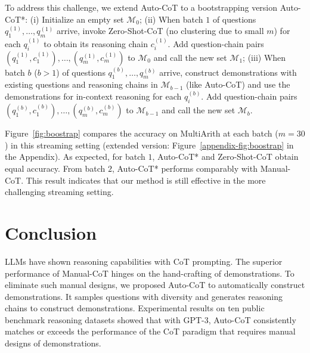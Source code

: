 To address this challenge, we extend Auto-CoT to a bootstrapping  version Auto-CoT*:
(i) Initialize an empty set $\mathcal{M}_0$;
(ii) When batch $1$ of questions $q_1^{(1)}, \ldots, q_m^{(1)}$ arrive, invoke Zero-Shot-CoT (no clustering due to small $m$) for each $q_i^{(1)}$ to obtain its reasoning chain $c_i^{(1)}$.
Add question-chain pairs $(q_1^{(1)}, c_1^{(1)}), \ldots, (q_m^{(1)}, c_m^{(1)})$ to $\mathcal{M}_0$ and call the new set $\mathcal{M}_1$;
(iii) When batch $b$ ($b>1$) of questions $q_1^{(b)}, \ldots, q_m^{(b)}$ arrive, construct demonstrations with existing questions and reasoning chains in $\mathcal{M}_{b-1}$ (like Auto-CoT) and use the demonstrations for in-context reasoning for each $q_i^{(b)}$.
Add question-chain pairs $(q_1^{(b)}, c_1^{(b)}), \ldots, (q_m^{(b)}, c_m^{(b)})$ to $\mathcal{M}_{b-1}$ and call the new set $\mathcal{M}_b$.

Figure~\ref{fig:boostrap} 
compares the accuracy on MultiArith at each batch ($m=30$) in this streaming setting 
(extended version: Figure~\ref{appendix-fig:boostrap} in the Appendix). 
As expected, for batch $1$, Auto-CoT* and Zero-Shot-CoT obtain equal accuracy. 
From batch $2$, Auto-CoT* performs comparably with Manual-CoT.
This result indicates that our method is still effective in the more challenging streaming setting.

\section{Conclusion}

LLMs have shown reasoning capabilities with CoT prompting. The superior performance of Manual-CoT hinges on the hand-crafting of demonstrations. To eliminate such manual designs, we proposed Auto-CoT to automatically construct demonstrations. It samples questions with diversity and generates reasoning chains to construct demonstrations. Experimental results on ten public benchmark reasoning datasets showed that with GPT-3, Auto-CoT consistently matches or exceeds the performance of the CoT paradigm that requires manual designs of demonstrations. 

\newpage

\newpage

